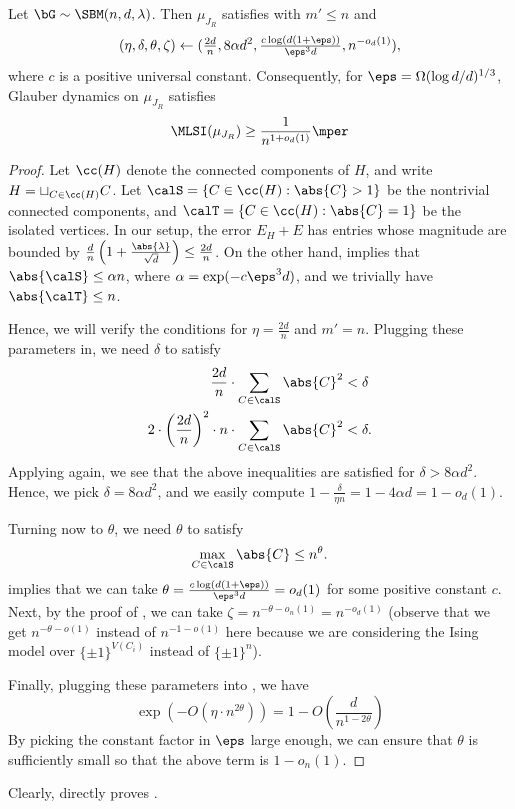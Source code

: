 \documentclass[11pt,letterpaper]{article}
\begin{document}
\begin{lemma}\label{lem:parameter-dep}
    Let $\bG \sim \SBM(n, d, \lambda)$. Then $\mu_{J_{R}}$ satisfies  with $m' \le n$ and
    \begin{align*}
        (\eta, \delta, \theta, \zeta) \leftarrow (\tfrac{2d}{n}, 8\alpha d^2, \tfrac{c\log(d(1+\eps))}{\eps^3 d}, n^{-o_d(1)}),
    \end{align*}
    where $c$ is a positive universal constant.
    Consequently, for $\eps = \Omega(\log d/d)^{1/3}$, Glauber dynamics on $\mu_{J_R}$ satisfies
    \[
        \MLSI(\mu_{J_R}) \ge \frac{1}{n^{1 + o_d(1)}}\mper
    \]
\end{lemma}
\begin{proof}
    Let $\cc(H)$ denote the connected components of $H$, and write $H = \sqcup_{C \in \cc(H)} C$. Let $\calS = \{C \in \cc(H): \abs{C} > 1\}$ be the nontrivial connected components, and $\calT = \{C \in \cc(H): \abs{C} = 1\}$ be the isolated vertices. 
    In our setup, the error $E_H + E$ has entries whose magnitude are bounded by $\frac{d}{n}\left(1 + \frac{\abs{\lambda}}{\sqrt{d}}\right) \le \frac{2d}{n}$. 
    On the other hand, 
     implies that $\abs{\calS} \le \alpha n$, where $\alpha = \exp(-c\eps^3 d)$, and we trivially have $\abs{\calT} \le n$.
    
    Hence, we will verify the conditions for $\eta = \frac{2d}{n}$ and $m' = n$.
    Plugging these parameters in, we need $\delta$ to satisfy
    \begin{align*}
        \frac{2 d}{n} \cdot \sum_{C \in \calS} \abs{C}^2 &< \delta \\
        2 \cdot \left(\frac{2d}{n}\right)^2 \cdot n \cdot \sum_{C \in \calS} \abs{C}^2 &< \delta.
    \end{align*}
    Applying  again, we see that the above inequalities are satisfied for $\delta > 8\alpha d^2$.
    Hence, we pick $\delta = 8\alpha d^2$, and we easily compute $1 - \frac{\delta}{\eta n} = 1 - 4\alpha d = 1 - o_d(1)$.

    Turning now to $\theta$, we need $\theta$ to satisfy 
    \[
        \max_{C \in \calS} \abs{C} \le  n^{\theta}.
    \]
     implies that we can take $\theta = \frac{c\log(d(1+\eps))}{\eps^3 d} = o_d(1)$ for some positive constant $c$. 
    Next, by the proof of , we can take $\zeta = n^{-\theta - o_n(1)} = n^{-o_d(1)}$ (observe that we get $n^{-\theta-o(1)}$ instead of $n^{-1-o(1)}$ here because we are considering the Ising model over $\{ \pm 1\}^{V(C_i)}$ instead of $\{\pm 1\}^n$).


    Finally, plugging these parameters into , we have 
    \[
        \exp(-O(\eta \cdot n^{2\theta})) = 1 - O\left(\frac{d}{n^{1-2\theta}}\right)
    \]
    By picking the constant factor in $\eps$ large enough, we can ensure that $\theta$ is sufficiently small so that the above term is $1 - o_n(1)$. 
\end{proof}
Clearly,  directly proves .
\end{document}
